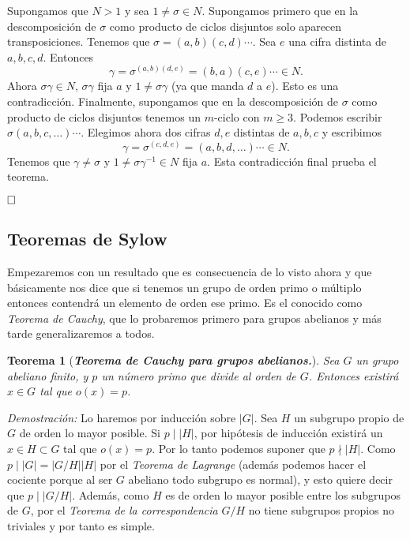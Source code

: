 \documentclass[12pt]{article}
\newtheorem{theorem}{Teorema}[section]
\begin{document}
Supongamos que $N > 1$ y sea $1 \neq \sigma \in N$. Supongamos primero que en la descomposición de $\sigma$ como producto de ciclos disjuntos solo aparecen transposiciones. Tenemos que $\sigma = (a,b)(c,d) \cdots$. Sea $e$ una cifra distinta de $a,b,c,d$. Entonces $$\gamma = \sigma^{(a,b)(d,e)}=(b,a)(c,e) \cdots \in N.$$
Ahora $\sigma \gamma \in N$, $\sigma \gamma$ fija $a$ y $1 \neq \sigma \gamma$ (ya que manda $d$ a $e$). Esto es una contradicción. Finalmente, supongamos que en la descomposición de $\sigma$ como producto de ciclos disjuntos tenemos un $m$-ciclo con $m \geq 3$. Podemos escribir $\sigma (a,b,c, \ldots) \cdots$. Elegimos ahora dos cifras $d,e$ distintas de $a,b,c$ y escribimos $$\gamma = \sigma^{(c,d,e)} = (a,b,d, \ldots) \cdots \in N.$$ Tenemos que $\gamma \neq \sigma$ y $1 \neq \sigma \gamma^{-1} \in N$ fija $a$. Esta contradicción final prueba el teorema.

$\hfill \square$

\subsection{Teoremas de Sylow}

Empezaremos con un resultado que es consecuencia de lo visto ahora y que básicamente nos dice que si tenemos un grupo de orden primo o múltiplo entonces contendrá un elemento de orden ese primo. Es el conocido como \textit{Teorema de Cauchy}, que lo probaremos primero para grupos abelianos y más tarde generalizaremos a todos.

\begin{theorem}[\textit{\textbf{Teorema de Cauchy para grupos abelianos.}}]
Sea $G$ un grupo abeliano finito, y $p$ un número primo que divide al orden de $G$. Entonces existirá $x \in G$ tal que $o(x) = p$.
\end{theorem}
\emph{Demostración: } Lo haremos por inducción sobre $|G|$. Sea $H$ un subgrupo propio de $G$ de orden lo mayor posible. Si $p \mid |H|$, por hipótesis de inducción existirá un $x \in H \subset G$ tal que $o(x) = p$. Por lo tanto podemos suponer que $ p \nmid |H|$. Como $p \mid |G| = |G/H| |H|$ por el \textit{Teorema de Lagrange} (además podemos hacer el cociente porque al ser $G$ abeliano todo subgrupo es normal), y esto quiere decir que $p \mid |G/H|$. Además, como $H$ es de orden lo mayor posible entre los subgrupos de $G$, por el \textit{Teorema de la correspondencia} $G/H$ no tiene subgrupos propios no triviales y por tanto es simple.
\end{document}
